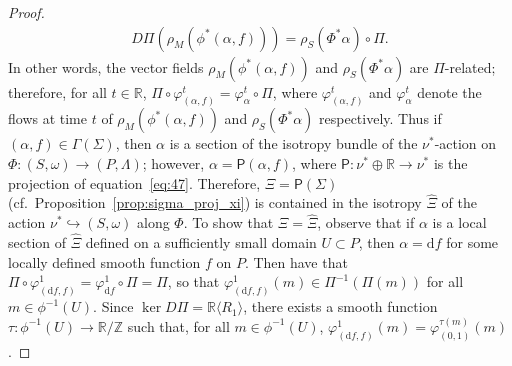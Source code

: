 \documentclass[10pt,a4paper]{amsart}
\numberwithin{equation}{section}
\newcommand{\de}{\mathrm{d}} %
\newcommand{\SM}{(S,\omega)} %
\newcommand{\PM}{(P,\Lambda)} %
\newcommand{\RR}{\mathbb{R}}
\newcommand{\ZZ}{\mathbb{Z}}
\begin{document}
\begin{proof}
 \begin{gather*}
 D \Pi(\rho_M(\phi^*(\alpha,f))) = \rho_S(\Phi^*\alpha) \circ \Pi.
 \end{gather*}
In other words, the vector f\/ields $\rho_M(\phi^*(\alpha,f))$ and $\rho_S(\Phi^*\alpha)$ are $\Pi$-related; therefore, for all $t \in \RR$, $\Pi \circ \varphi^t_{(\alpha,f)} = \varphi^t_{\alpha} \circ \Pi$, where $\varphi^t_{(\alpha,f)}$ and $\varphi^t_{\alpha}$ denote the f\/lows at time $t$ of $\rho_M(\phi^*(\alpha,f))$ and $\rho_S(\Phi^*\alpha)$ respectively. Thus if $(\alpha,f) \in \Gamma(\Sigma)$, then $\alpha$ is a section of the isotropy bundle of the $\nu^*$-action on $\Phi \colon \SM \to \PM$; however, $\alpha = \mathsf{P}(\alpha,f)$, where $\mathsf{P} \colon \nu^* \oplus \RR \to \nu^*$ is the projection of equation~\eqref{eq:47}. Therefore, $\Xi = \mathsf{P}(\Sigma)$ (cf.\ Proposition~\ref{prop:sigma_proj_xi}) is contained in the isotropy $\hat{\Xi}$ of the action $\nu^* \hookrightarrow \SM$ along $\Phi$. To show that $\Xi = \hat{\Xi}$, observe that if $\alpha$ is a local section of $\hat{\Xi}$ def\/ined on a suf\/f\/iciently small domain $U \subset P$, then $\alpha = \de f$ for some locally def\/ined smooth function $f$ on $P$. Then have that $\Pi \circ \varphi^1_{(\de f,f)} = \varphi^1_{\de f} \circ \Pi = \Pi$, so that $\varphi^1_{(\de f,f)}(m) \in \Pi^{-1}(\Pi(m))$ for all $m \in \phi^{-1}(U)$. Since $\ker D\Pi = \RR \langle R_1 \rangle$, there exists a smooth function $\tau \colon \phi^{-1}(U) \to \RR/\ZZ$ such that, for all $m \in
 \phi^{-1}(U)$, $\varphi^1_{(\de f,f)}(m) = \varphi^{\tau(m)}_{(0,1)}(m)$.


\end{proof}
\end{document}
